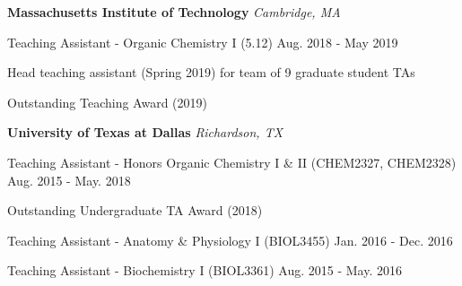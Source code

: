 \begin{cventries}

\begin{rSection}{}{\bodyfont\bfseries\hspace{-1.6em} {Massachusetts Institute of Technology}} \hfill{\bodyfont\slshape\color{awesome} {Cambridge, MA}}
\end{rSection}


  \cventry
    {Teaching Assistant - Organic Chemistry I (5.12)} %
    {} %
    {} %
    {Aug. 2018 - May 2019} %
    {
      \begin{cvitems} %
        \item[] {Head teaching assistant (Spring 2019) for team of 9 graduate student TAs}
        \item[] {Outstanding Teaching Award (2019)}
      \end{cvitems}
    }

\begin{rSection}{}{\bodyfont\bfseries\hspace{-1.6em} {University of Texas at Dallas}} \hfill{\bodyfont\slshape\color{awesome} {Richardson, TX}}
\end{rSection}

\cventry
{Teaching Assistant - Honors Organic Chemistry I \& II (CHEM2327, CHEM2328)} %
{} %
{} %
{Aug. 2015 - May. 2018} %
{
  \begin{cvitems} %
    \item[] {Outstanding Undergraduate TA Award (2018)}
  \end{cvitems}
}

\cventryshort
  {Teaching Assistant - Anatomy \& Physiology I (BIOL3455)} %
  {} %
  {} %
  {Jan. 2016 - Dec. 2016} %

\cventryshort
{Teaching Assistant - Biochemistry I (BIOL3361)} %
{} %
{} %
{Aug. 2015 - May. 2016} %

\end{cventries}
